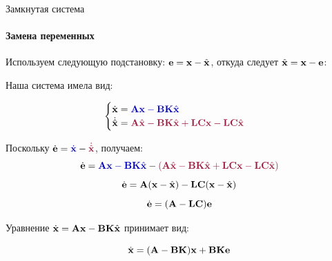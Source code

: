 \documentclass{beamer}
\begin{document}
\begin{frame}{Замкнутая система}
	\framesubtitle{Замена переменных}
	\begin{flushleft}
		
		Используем следующую подстановку: $\mathbf{e} = \mathbf{x} - \hat{\mathbf{x}}$, откуда следует $\hat{\mathbf{x}} = \mathbf{x} - \mathbf{e}$:
		
		Наша система имела вид:
		
		\begin{equation}
			\begin{cases}
				\dot {\bo{x}} = \textcolor{mydarkblue}{\bo{A} \bo{x} - \bo{B}\bo{K} \hat{\bo{x}}} \\
				\dot{\hat{\bo{x}}} = \textcolor{mydarkpink}{\bo{A} \hat{\bo{x}} - \bo{B}\bo{K} \hat{\bo{x}} + \bo{L}\bo{C} \bo{x} - \bo{L}\bo{C} \hat{\bo{x}}}
			\end{cases}
		\end{equation}
		
		Поскольку $\dot{\bo{e}} = \textcolor{mydarkblue}{\dot{\bo{x}}} - \textcolor{mydarkpink}{\dot{\hat{\bo{x}}}}$, получаем:
		\[
		\dot{\bo{e}} = 
		\textcolor{mydarkblue}{\bo{A} \bo{x} - \bo{B}\bo{K} \hat{\bo{x}}} - 
		\textcolor{mydarkpink}{(\bo{A} \hat{\bo{x}} - \bo{B}\bo{K} \hat{\bo{x}} + \bo{L}\bo{C} \bo{x} - \bo{L}\bo{C} \hat{\bo{x}})}
		\]
		\[
		\dot{\mathbf{e}} = 
		\mathbf{A} (\mathbf{x} - \hat{\mathbf{x}}) - \mathbf{L}\mathbf{C}(\mathbf{x} - \hat{\mathbf{x}})
		\]
		\[
		\dot{\mathbf{e}} = 
		(\mathbf{A} - \mathbf{L}\mathbf{C})\mathbf{e}
		\]
		
		Уравнение $\dot {\mathbf{x}} = \mathbf{A} \mathbf{x} - \mathbf{B}\mathbf{K} \hat{\mathbf{x}}$ принимает вид:
		
		\[
		\dot {\mathbf{x}} = (\mathbf{A}-\mathbf{B}\mathbf{K}) \mathbf{x} + \mathbf{B}\mathbf{K}\mathbf{e}
		\]
		
	\end{flushleft}
\end{frame}
\end{document}
